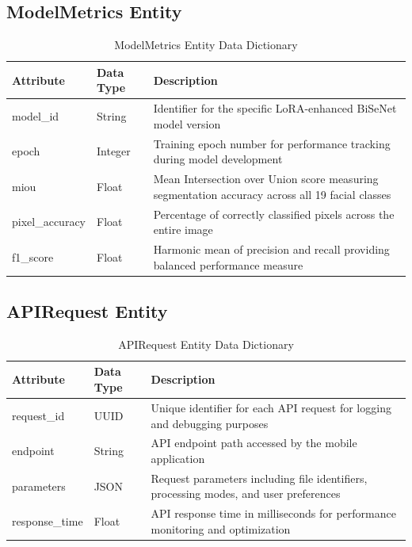 \documentclass[12pt,a4paper]{report}
\begin{document}
\subsection{ModelMetrics Entity}

\begin{table}[H]
\centering
\caption{ModelMetrics Entity Data Dictionary}
\label{tab:model_metrics_entity}
\begin{tabular}{|p{3cm}|p{2.5cm}|p{6.5cm}|}
\hline
\textbf{Attribute} & \textbf{Data Type} & \textbf{Description} \\
\hline
model\_id & String & Identifier for the specific LoRA-enhanced BiSeNet model version \\
\hline
epoch & Integer & Training epoch number for performance tracking during model development \\
\hline
miou & Float & Mean Intersection over Union score measuring segmentation accuracy across all 19 facial classes \\
\hline
pixel\_accuracy & Float & Percentage of correctly classified pixels across the entire image \\
\hline
f1\_score & Float & Harmonic mean of precision and recall providing balanced performance measure \\
\hline
\end{tabular}
\end{table}

\subsection{APIRequest Entity}

\begin{table}[H]
\centering
\caption{APIRequest Entity Data Dictionary}
\label{tab:api_request_entity}
\begin{tabular}{|p{3cm}|p{2.5cm}|p{6.5cm}|}
\hline
\textbf{Attribute} & \textbf{Data Type} & \textbf{Description} \\
\hline
request\_id & UUID & Unique identifier for each API request for logging and debugging purposes \\
\hline
endpoint & String & API endpoint path accessed by the mobile application \\
\hline
parameters & JSON & Request parameters including file identifiers, processing modes, and user preferences \\
\hline
response\_time & Float & API response time in milliseconds for performance monitoring and optimization \\
\hline
\end{tabular}
\end{table}
\end{document}
